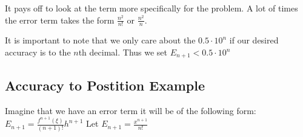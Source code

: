 It pays off to look at the term more specifically for the problem. A lot of times the
error term takes the form $\frac{n^2}{n!}$ or $\frac{n^2}{n}$.

It is important to note that we only care about the $0.5 \cdot 10^n$ if our desired
accuracy is to the $n$th decimal. Thus we set $E_{n+1} < 0.5 \cdot 10^n$

\subsection*{Accuracy to Postition Example}
Imagine that we have an error term it will be of the following form:\\
$ E_{n+1} = \frac{f^{n+1}(\xi)}{(n+1)!}h^{n+1} $ Let $E_{n+1} = \frac{x^{n+1}}{n!}$\\
